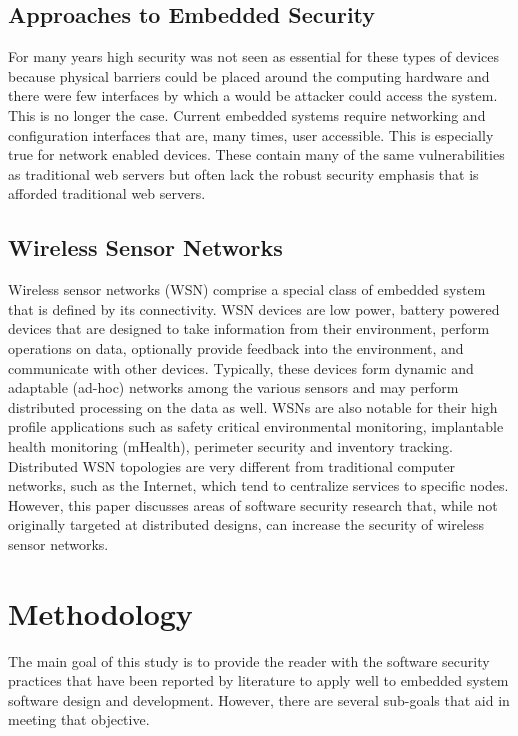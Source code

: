 \documentclass[draftcls,onecolumn,conference,12pt]{IEEEtran}
\begin{document}
\subsection{Approaches to Embedded Security}

For many years high security was not seen as essential for these types of devices because physical barriers could be placed around the computing hardware and there were few interfaces by which a would be attacker could access the system.  This is no longer the case.  Current embedded systems require networking and configuration interfaces that are, many times, user accessible.  This is especially true for network enabled devices.  These contain many of the same vulnerabilities as traditional web servers but often lack the robust security emphasis that is afforded traditional web servers. \cite{Kumar2012}

\subsection{Wireless Sensor Networks}

Wireless sensor networks (WSN) comprise a special class of embedded system that is defined by its connectivity.  WSN devices are low power, battery powered devices that are designed to take information from their environment, perform operations on data, optionally provide feedback into the environment, and communicate with other devices.  Typically, these devices form dynamic and adaptable (ad-hoc) networks among the various sensors and may perform distributed processing on the data as well.  WSNs are also notable for their high profile applications such as safety critical environmental monitoring, implantable health monitoring (mHealth), perimeter security and inventory tracking.\cite{Bojinov2010,Mahdavi-Hezavehi2013}  Distributed WSN topologies are very different from traditional computer networks, such as the Internet, which tend to centralize services to specific nodes. However, this paper discusses areas of software security research that, while not originally targeted at distributed designs, can increase the security of wireless sensor networks.

\section{Methodology}
The main goal of this study is to provide the reader with the software security practices that have been reported by literature to apply well to embedded system software design and development.  However, there are several sub-goals that aid in meeting that objective.  
\end{document}
